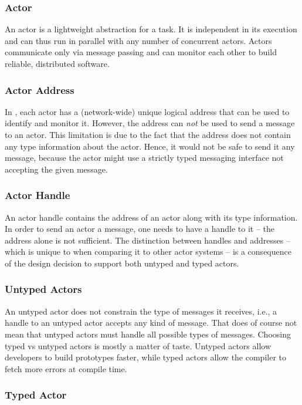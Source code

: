 \subsubsection{Actor}

An actor is a lightweight abstraction for a task.
It is independent in its execution and can thus run in parallel with any number of concurrent actors.
Actors communicate only via message passing and can monitor each other to build reliable, distributed software.

\subsubsection{Actor Address}

In \ba, each actor has a (network-wide) unique logical address that can be used to identify and monitor it.
However, the address can \emph{not} be used to send a message to an actor.
This limitation is due to the fact that the address does not contain any type information about the actor.
Hence, it would not be safe to send it any message, because the actor might use a strictly typed messaging interface not accepting the given message.

\subsubsection{Actor Handle}

An actor handle contains the address of an actor along with its type information.
In order to send an actor a message, one needs to have a handle to it -- the address alone is not sufficient.
The distinction between handles and addresses -- which is unique to \ba when comparing it to other actor systems -- is a consequence of the design decision to support both untyped and typed actors.

\subsubsection{Untyped Actors}

An untyped actor does not constrain the type of messages it receives, i.e., a handle to an untyped actor accepts any kind of message.
That does of course not mean that untyped actors must handle all possible types of messages.
Choosing typed vs untyped actors is mostly a matter of taste.
Untyped actors allow developers to build prototypes faster, while typed actors allow the compiler to fetch more errors at compile time.

\subsubsection{Typed Actor}


